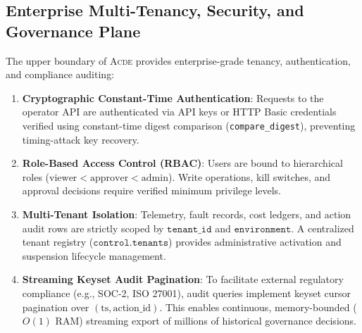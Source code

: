 \subsection{Enterprise Multi-Tenancy, Security, and Governance Plane}
\label{subsec:enterprise}

The upper boundary of \textsc{Acde} provides enterprise-grade tenancy, authentication, and compliance auditing:
\begin{enumerate}
    \item \textbf{Cryptographic Constant-Time Authentication}: Requests to the operator API are authenticated via API keys or HTTP Basic credentials verified using constant-time digest comparison (\texttt{compare\_digest}), preventing timing-attack key recovery.
    \item \textbf{Role-Based Access Control (RBAC)}: Users are bound to hierarchical roles ($\text{viewer} < \text{approver} < \text{admin}$). Write operations, kill switches, and approval decisions require verified minimum privilege levels.
    \item \textbf{Multi-Tenant Isolation}: Telemetry, fault records, cost ledgers, and action audit rows are strictly scoped by $\texttt{tenant\_id}$ and $\texttt{environment}$. A centralized tenant registry ($\texttt{control.tenants}$) provides administrative activation and suspension lifecycle management.
    \item \textbf{Streaming Keyset Audit Pagination}: To facilitate external regulatory compliance (e.g., SOC-2, ISO 27001), audit queries implement keyset cursor pagination over $(\text{ts}, \text{action\_id})$. This enables continuous, memory-bounded ($O(1)$ RAM) streaming export of millions of historical governance decisions.
\end{enumerate}
